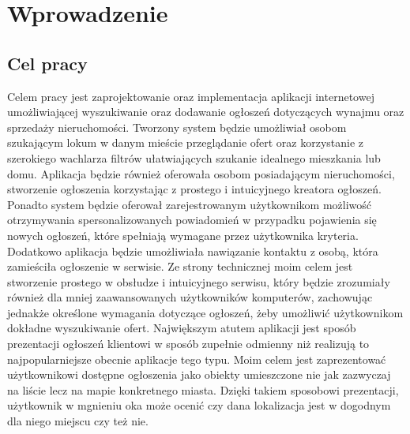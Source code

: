 \chapter{Wprowadzenie}
\label{cha:wprowadzenie}


\section{Cel pracy}
\label{sec:celPracy}
Celem pracy jest zaprojektowanie oraz implementacja aplikacji internetowej umożliwiającej wyszukiwanie oraz dodawanie ogłoszeń dotyczących wynajmu oraz sprzedaży nieruchomości. Tworzony system będzie umożliwiał osobom szukającym lokum w danym mieście przeglądanie ofert oraz korzystanie z szerokiego wachlarza filtrów ułatwiających szukanie idealnego mieszkania lub domu. Aplikacja będzie również oferowała osobom posiadającym nieruchomości, stworzenie ogłoszenia korzystając z prostego i intuicyjnego kreatora ogłoszeń. Ponadto system będzie oferował zarejestrowanym użytkownikom możliwość otrzymywania  spersonalizowanych powiadomień w przypadku pojawienia się nowych ogłoszeń, które spełniają wymagane przez użytkownika kryteria. Dodatkowo aplikacja będzie umożliwiała nawiązanie kontaktu z osobą, która zamieściła ogłoszenie w serwisie. Ze strony technicznej moim celem jest stworzenie prostego w obsłudze i intuicyjnego serwisu, który będzie zrozumiały również dla mniej zaawansowanych użytkowników komputerów, zachowując jednakże określone wymagania dotyczące ogłoszeń, żeby umożliwić użytkownikom dokładne wyszukiwanie ofert. Największym atutem aplikacji jest sposób prezentacji ogłoszeń klientowi w sposób zupełnie odmienny niż realizują to najpopularniejsze obecnie aplikacje tego typu. Moim celem jest zaprezentować użytkownikowi dostępne ogłoszenia jako obiekty umieszczone nie jak zazwyczaj na liście lecz na mapie konkretnego miasta. Dzięki takiem sposobowi prezentacji, użytkownik w mgnieniu oka może ocenić czy dana lokalizacja jest w dogodnym dla niego miejscu czy też nie.


